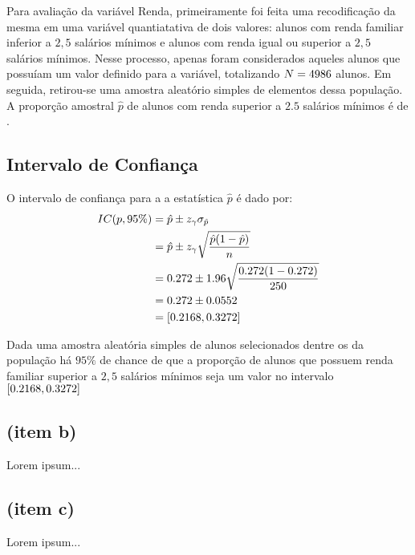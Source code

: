 

Para avaliação da variável Renda, primeiramente foi feita uma recodificação
da mesma em uma variável quantiatativa de dois valores: alunos com renda
familiar inferior a $2,5$ salários mínimos e alunos com renda igual ou
superior a $2,5$ salários mínimos. Nesse processo, apenas foram considerados
aqueles alunos que possuíam um valor definido para a variável, totalizando
$N=4986$ alunos. Em seguida, retirou-se uma amostra aleatório simples de
\SEISn elementos dessa população. A proporção amostral $\hat{p}$ de alunos
com renda superior a $2.5$ salários mínimos é de \SEISpAmostral.

\subsection{Intervalo de Confiança}

	O intervalo de confiança para a a estatística $\hat{p}$ é dado por:
	\begin{align*}
		IC(p, 95\%) &= \hat{p} \pm z_\gamma \sigma_{\hat{p}} \\
					&= \hat{p} \pm z_\gamma \sqrt{\frac{\hat{p}(1-\hat{p})}{n}} \\
					&= 0.272 \pm 1.96 \sqrt{\frac{0.272 (1- 0.272)}{250}} \nonumber \\
					&= 0.272 \pm 0.0552 \nonumber \\
					&= [0.2168, 0.3272]
	\end{align*}

	\noindent Dada uma amostra aleatória simples de \SEISn alunos
	selecionados dentre os \SEISN da população há $95\%$ de chance de que a
	proporção de alunos que possuem renda familiar superior a $2,5$ salários
	mínimos seja um valor no intervalo $[0.2168, 0.3272]$

\subsection{(item b)}
Lorem ipsum...

\subsection{(item c)}
Lorem ipsum...
